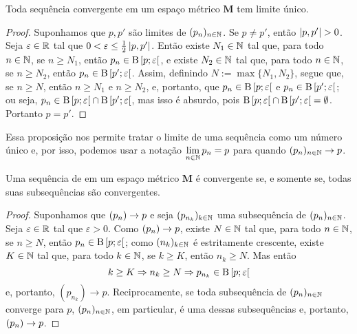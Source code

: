 \begin{corollary}
Toda sequência convergente em um espaço métrico $\bm M$ tem limite único.
\end{corollary}
\begin{proof}
Suponhamos que $p,p'$ são limites de $(p_n)_{n \in \mathbb{N}}$. Se $p \neq p'$, então $\left\vert{p},{p'}\right\vert>0$. Seja $\varepsilon \in \mathbb{R}$ tal que $0 < \varepsilon \leq \frac{1}{2} \left\vert{p},{p'}\right\vert$. Então existe $N_1 \in \mathbb{N}$ tal que, para todo $n \in \mathbb{N}$, se $n \geq N_1$, então $p_n \in \mathrm{B}\left[{p};{\varepsilon}\right[$, e existe $N_2 \in \mathbb{N}$ tal que, para todo $n \in \mathbb{N}$, se $n \geq N_2$, então $p_n \in \mathrm{B}\left[{p'};{\varepsilon}\right[$. Assim, definindo $N := \max \{N_1,N_2\}$, segue que, se $n \geq N$, então $n \geq N_1$ e $n \geq N_2$, e, portanto, que $p_n \in \mathrm{B}\left[{p};{\varepsilon}\right[$ e $p_n \in \mathrm{B}\left[{p'};{\varepsilon}\right[$; ou seja, $p_n \in \mathrm{B}\left[{p};{\varepsilon}\right[ \cap \mathrm{B}\left[{p'};{\varepsilon}\right[$, mas isso é absurdo, pois $\mathrm{B}\left[{p};{\varepsilon}\right[ \cap \mathrm{B}\left[{p'};{\varepsilon}\right[=\emptyset$. Portanto $p=p'$.
\end{proof}

Essa proposição nos permite tratar o limite de uma sequência como um número único e, por isso, podemos usar a notação $\displaystyle\lim_{n \in \mathbb{N}} p_n = p$ para quando $(p_n)_{n \in \mathbb{N}} \rightarrow p$.

\begin{proposition}
Uma sequência de em um espaço métrico $\bm M$ é convergente se, e somente se, todas suas subsequências são convergentes.
\end{proposition}
\begin{proof}
	Suponhamos que $(p_n) \rightarrow p$ e seja $(p_{n_k})_{k \in \mathbb{N}}$ uma subsequência de $(p_n)_{n \in \mathbb{N}}$. Seja $\varepsilon \in \mathbb{R}$ tal que $\varepsilon > 0$. Como $(p_n) \rightarrow p$, existe $N \in \mathbb{N}$ tal que, para todo $n \in \mathbb{N}$, se $n \geq N$, então $p_n \in \mathrm{B}\left[{p};{\varepsilon}\right[$; como $(n_k)_{k \in \mathbb{N}}$ é estritamente crescente, existe $K \in \mathbb{N}$ tal que, para todo $k \in \mathbb{N}$, se $k \geq K$, então $n_k \geq N$. Mas então
	\begin{equation*}
	k \geq K \Rightarrow n_k \geq N \Rightarrow p_{n_k} \in \mathrm{B}\left[{p};{\varepsilon}\right[
	\end{equation*}
e, portanto, $(p_{n_k}) \to p$.	Reciprocamente, se toda subsequência de $(p_n)_{n \in \mathbb{N}}$ converge para $p$, $(p_n)_{n \in \mathbb{N}}$, em particular, é uma dessas subsequências e, portanto, $(p_n) \rightarrow p$.
\end{proof}

